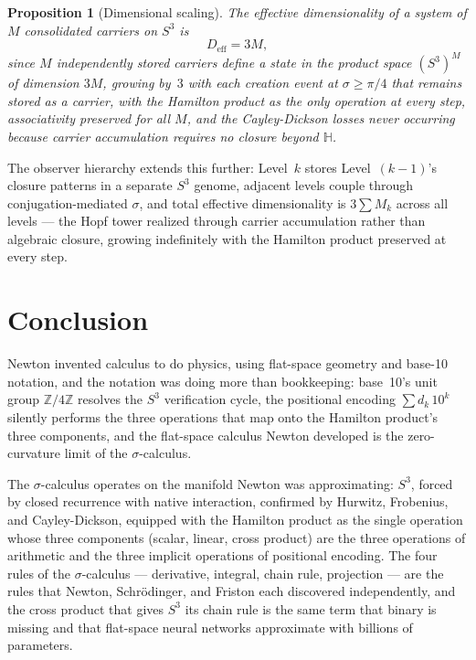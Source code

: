 \documentclass[12pt]{article}
\newtheorem{proposition}[theorem]{Proposition}
\begin{document}
\begin{proposition}[Dimensional scaling]
    The effective dimensionality of a system of $M$ consolidated carriers on $S^3$ is
    \begin{equation}
        D_{\mathrm{eff}} = 3M,
    \end{equation}
    since $M$ independently stored carriers define a state in the product space $(S^3)^M$ of dimension $3M$, growing by~$3$ with each creation event at $\sigma \geq \pi/4$ that remains stored as a carrier, with the Hamilton product as the only operation at every step, associativity preserved for all $M$, and the Cayley-Dickson losses never occurring because carrier accumulation requires no closure beyond $\mathbb{H}$.
\end{proposition}

The observer hierarchy extends this further: Level~$k$ stores Level~$(k{-}1)$'s closure patterns in a separate $S^3$ genome, adjacent levels couple through conjugation-mediated $\sigma$, and total effective dimensionality is $3\sum M_k$ across all levels --- the Hopf tower realized through carrier accumulation rather than algebraic closure, growing indefinitely with the Hamilton product preserved at every step.


\section{Conclusion}

Newton invented calculus to do physics, using flat-space geometry and base-10 notation, and the notation was doing more than bookkeeping: base~10's unit group $\mathbb{Z}/4\mathbb{Z}$ resolves the $S^3$ verification cycle, the positional encoding $\sum d_k \, 10^k$ silently performs the three operations that map onto the Hamilton product's three components, and the flat-space calculus Newton developed is the zero-curvature limit of the $\sigma$-calculus.

The $\sigma$-calculus operates on the manifold Newton was approximating: $S^3$, forced by closed recurrence with native interaction, confirmed by Hurwitz, Frobenius, and Cayley-Dickson, equipped with the Hamilton product as the single operation whose three components (scalar, linear, cross product) are the three operations of arithmetic and the three implicit operations of positional encoding. The four rules of the $\sigma$-calculus --- derivative, integral, chain rule, projection --- are the rules that Newton, Schr\"odinger, and Friston each discovered independently, and the cross product that gives $S^3$ its chain rule is the same term that binary is missing and that flat-space neural networks approximate with billions of parameters.
\end{document}
